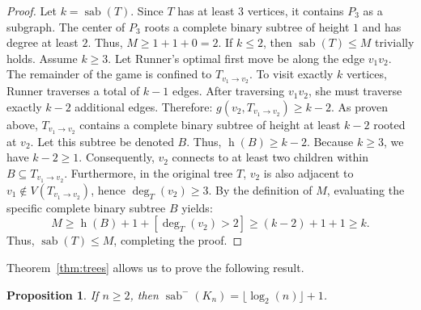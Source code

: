 \documentclass[10pt,a4paper]{amsart}
\newtheorem{proposition}[theorem]{Proposition}
\DeclareMathOperator{\sab}{\mathrm{sab}}
\DeclareMathOperator{\height}{\mathrm{h}}
\begin{document}
\begin{proof}
Let $k = \sab(T)$. Since $T$ has at least $3$ vertices, it contains $P_3$ as a subgraph. The center of $P_3$ roots a complete binary subtree of height $1$ and has degree at least $2$. Thus, $M \ge 1 + 1 + 0 = 2$. If $k \le 2$, then $\sab(T) \le M$ trivially holds. 
Assume $k \ge 3$. Let Runner's optimal first move be along the edge $v_1v_2$. The remainder of the game is confined to $T_{v_1 \to v_2}$. To visit exactly $k$ vertices, Runner traverses a total of $k-1$ edges. After traversing $v_1v_2$, she must traverse exactly $k-2$ additional edges. Therefore: 
$g(v_2, T_{v_1 \to v_2}) \ge k-2$.
As proven above, $T_{v_1 \to v_2}$ contains a complete binary subtree of height at least $k-2$ rooted at $v_2$. Let this subtree be denoted $B$. Thus, $\height(B) \ge k-2$. 
Because $k \ge 3$, we have $k-2 \ge 1$. Consequently, $v_2$ connects to at least two children within $B \subseteq T_{v_1 \to v_2}$. Furthermore, in the original tree $T$, $v_2$ is also adjacent to $v_1 \notin V(T_{v_1 \to v_2})$, hence $\deg_T(v_2) \ge 3$.
By the definition of $M$, evaluating the specific complete binary subtree $B$ yields:
$$M \ge \height(B) + 1 + [\deg_T(v_2) > 2] \ge (k-2) + 1 + 1 \ge k.$$
Thus, $\sab(T) \le M$, completing the proof.
\end{proof}

Theorem~\ref{thm:trees} allows us to prove the following result. 

\begin{proposition}
\label{prp:complete-graphs-lower}
If $n\ge 2$, then $\sab^{-}(K_n) = \lfloor \log_2(n) \rfloor + 1$.
\end{proposition}
\end{document}
